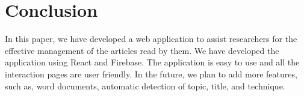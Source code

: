 \section{Conclusion} In this paper, we have developed a web application to assist researchers for the effective management of the articles read by them. We have developed the application using React and Firebase. The application is easy to use and all the interaction pages are user friendly. In the future, we plan to add more features, such as, word documents, automatic detection of topic, title, and technique. 